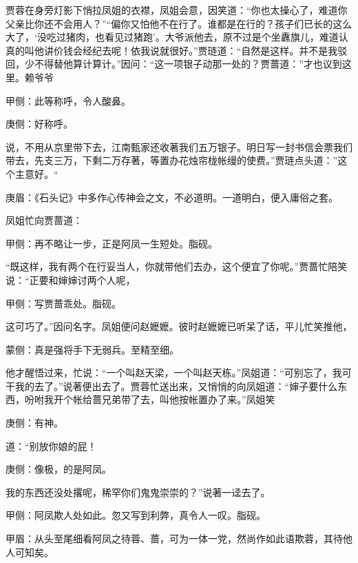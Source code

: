 \begin{parag}
    贾蓉在身旁灯影下悄拉凤姐的衣襟，凤姐会意，因笑道：“你也太操心了，难道你父亲比你还不会用人？”“偏你又怕他不在行了。谁都是在行的？孩子们已长的这么大了，‘没吃过猪肉，也看见过猪跑’。大爷派他去，原不过是个坐纛旗儿，难道认真的叫他讲价钱会经纪去呢！依我说就很好。”贾琏道：“自然是这样。并不是我驳回，少不得替他算计算计。”因问：“这一项银子动那一处的？贾蔷道：”才也议到这里。赖爷爷\begin{note}甲侧：此等称呼，令人酸鼻。\end{note}\begin{note}庚侧：好称呼。\end{note}说，不用从京里带下去，江南甄家还收著我们五万银子。明日写一封书信会票我们带去，先支三万，下剩二万存著，等置办花烛帘栊帐缦的使费。”贾琏点头道：”这个主意好。“\begin{note}庚眉：《石头记》中多作心传神会之文，不必道明。一道明白，便入庸俗之套。\end{note}
\end{parag}


\begin{parag}
    凤姐忙向贾蔷道：\begin{note}甲侧：再不略让一步，正是阿凤一生短处。脂砚。\end{note}“既这样，我有两个在行妥当人，你就带他们去办，这个便宜了你呢。”贾蔷忙陪笑说：“正要和婶婶讨两个人呢，\begin{note}甲侧：写贾蔷乖处。脂砚。\end{note}这可巧了。”因问名字。凤姐便问赵嬷嬷。彼时赵嬷嬷已听呆了话，平儿忙笑推他，\begin{note}蒙侧：真是强将手下无弱兵。至精至细。\end{note}他才醒悟过来，忙说：“一个叫赵天梁，一个叫赵天栋。”凤姐道：“可别忘了，我可干我的去了。”说著便出去了。贾蓉忙送出来，又悄悄的向凤姐道：“婶子要什么东西，吩咐我开个帐给蔷兄弟带了去，叫他按帐置办了来。”凤姐笑\begin{note}庚侧：有神。\end{note}道：“别放你娘的屁！\begin{note}庚侧：像极，的是阿凤。\end{note}我的东西还没处撂呢，稀罕你们鬼鬼崇崇的？”说著一迳去了。\begin{note}甲侧：阿凤欺人处如此。忽又写到利弊，真令人一叹。脂砚。\end{note}\begin{note}甲眉：从头至尾细看阿凤之待蓉、蔷，可为一体一党，然尚作如此语欺蓉，其待他人可知矣。\end{note}
\end{parag}


